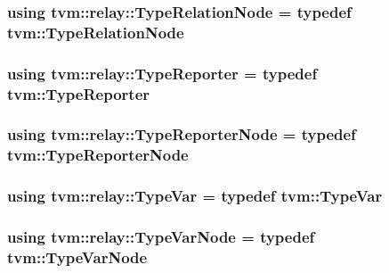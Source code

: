 \subsubsection[{\texorpdfstring{Type\+Relation\+Node}{TypeRelationNode}}]{\setlength{\rightskip}{0pt plus 5cm}using {\bf tvm\+::relay\+::\+Type\+Relation\+Node} = typedef {\bf tvm\+::\+Type\+Relation\+Node}}\hypertarget{namespacetvm_1_1relay_a89d812eaf13520b04e89a9414c51748c}{}\label{namespacetvm_1_1relay_a89d812eaf13520b04e89a9414c51748c}
\subsubsection[{\texorpdfstring{Type\+Reporter}{TypeReporter}}]{\setlength{\rightskip}{0pt plus 5cm}using {\bf tvm\+::relay\+::\+Type\+Reporter} = typedef {\bf tvm\+::\+Type\+Reporter}}\hypertarget{namespacetvm_1_1relay_afa9be9990c2006832cbfc02ebb35e527}{}\label{namespacetvm_1_1relay_afa9be9990c2006832cbfc02ebb35e527}
\subsubsection[{\texorpdfstring{Type\+Reporter\+Node}{TypeReporterNode}}]{\setlength{\rightskip}{0pt plus 5cm}using {\bf tvm\+::relay\+::\+Type\+Reporter\+Node} = typedef {\bf tvm\+::\+Type\+Reporter\+Node}}\hypertarget{namespacetvm_1_1relay_aaa3b5700ea20db399f539cec1abcb12b}{}\label{namespacetvm_1_1relay_aaa3b5700ea20db399f539cec1abcb12b}
\subsubsection[{\texorpdfstring{Type\+Var}{TypeVar}}]{\setlength{\rightskip}{0pt plus 5cm}using {\bf tvm\+::relay\+::\+Type\+Var} = typedef {\bf tvm\+::\+Type\+Var}}\hypertarget{namespacetvm_1_1relay_a63321eb51080f3f57dd7563a3ca0bfa6}{}\label{namespacetvm_1_1relay_a63321eb51080f3f57dd7563a3ca0bfa6}
\subsubsection[{\texorpdfstring{Type\+Var\+Node}{TypeVarNode}}]{\setlength{\rightskip}{0pt plus 5cm}using {\bf tvm\+::relay\+::\+Type\+Var\+Node} = typedef {\bf tvm\+::\+Type\+Var\+Node}}\hypertarget{namespacetvm_1_1relay_ab2cbe31b81ebd71ea8028a8404a7c9f3}{}\label{namespacetvm_1_1relay_ab2cbe31b81ebd71ea8028a8404a7c9f3}


